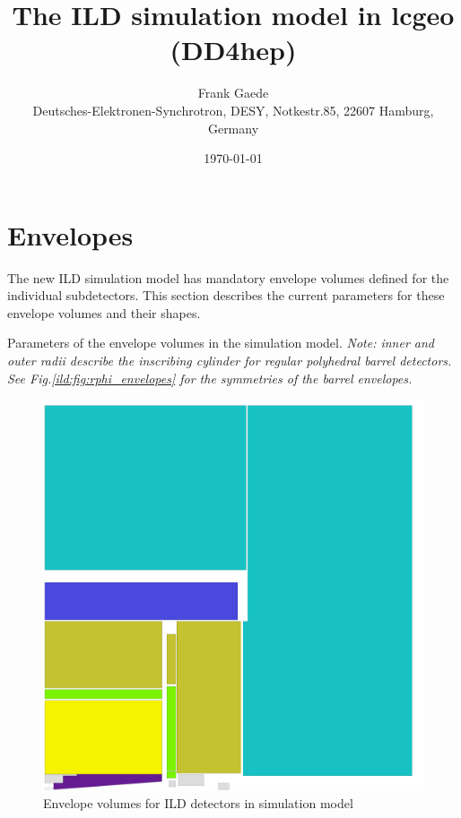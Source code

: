 \documentclass[a4paper]{article}
\title{The ILD simulation model in lcgeo (DD4hep) }
\author{Frank Gaede \\ %
  Deutsches-Elektronen-Synchrotron, DESY, Notkestr.85, 22607 Hamburg, Germany
}
\date{\today}
\begin{document}
\maketitle

\section{Envelopes}
The new ILD simulation model has mandatory envelope volumes defined for the individual subdetectors.
This section describes the current parameters for these envelope volumes and their shapes.


{\small
  \begin{table}
    
    \caption{Parameters of the envelope volumes in the simulation model. 
      \em{Note: inner and outer radii describe the inscribing cylinder for regular polyhedral barrel detectors.}
      See Fig.\ref{ild:fig:rphi_envelopes} for the symmetries of the barrel envelopes.
    }

  \end{table}
}

\begin{figure}[th]
  \centering
  \includegraphics[width=\columnwidth]{ILD_rz_quadrant}
  \caption{Envelope volumes for ILD detectors in simulation model}
  \label{ild:fig:rz_envelopes}
\end{figure}
\end{document}
